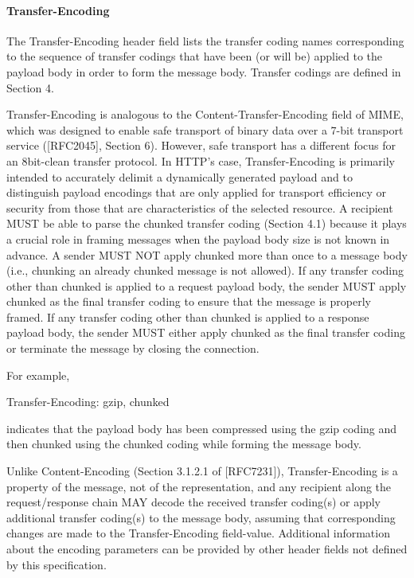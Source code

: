 \paragraph{Transfer-Encoding }

The Transfer-Encoding header field lists the transfer coding names
corresponding to the sequence of transfer codings that have been (or
will be) applied to the payload body in order to form the message
body.  Transfer codings are defined in Section 4.


Transfer-Encoding is analogous to the Content-Transfer-Encoding field
of MIME, which was designed to enable safe transport of binary data
over a 7-bit transport service ([RFC2045], Section 6).  However, safe
transport has a different focus for an 8bit-clean transfer protocol.
In HTTP's case, Transfer-Encoding is primarily intended to accurately
delimit a dynamically generated payload and to distinguish payload
encodings that are only applied for transport efficiency or security
from those that are characteristics of the selected resource.
A recipient MUST be able to parse the chunked transfer coding
(Section 4.1) because it plays a crucial role in framing messages
when the payload body size is not known in advance.  A sender MUST
NOT apply chunked more than once to a message body (i.e., chunking an
already chunked message is not allowed).  If any transfer coding
other than chunked is applied to a request payload body, the sender
MUST apply chunked as the final transfer coding to ensure that the
message is properly framed.  If any transfer coding other than
chunked is applied to a response payload body, the sender MUST either
apply chunked as the final transfer coding or terminate the message
by closing the connection.

For example,

  Transfer-Encoding: gzip, chunked

indicates that the payload body has been compressed using the gzip
coding and then chunked using the chunked coding while forming the
message body.

Unlike Content-Encoding (Section 3.1.2.1 of [RFC7231]),
Transfer-Encoding is a property of the message, not of the
representation, and any recipient along the request/response chain
MAY decode the received transfer coding(s) or apply additional
transfer coding(s) to the message body, assuming that corresponding
changes are made to the Transfer-Encoding field-value.  Additional
information about the encoding parameters can be provided by other
header fields not defined by this specification.

